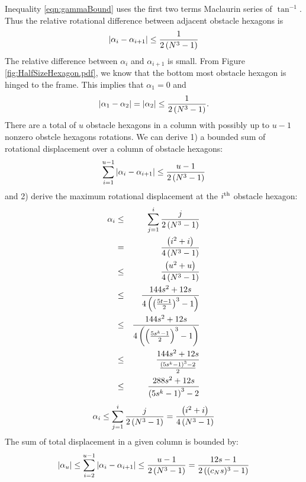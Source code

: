 Inequality \ref{eqn:gammaBound} uses the first two terms Maclaurin series of $\tan^{-1}$.
Thus the relative rotational difference between adjacent obstacle hexagons is
\begin{equation}\label{eqn:angularBound}
\left\vert \alpha_i - \alpha_{i+1} \right\vert \leq \frac{1}{2\left( N^3 - 1 \right)}
\end{equation}
The relative difference between $\alpha_i$ and $\alpha_{i+1}$ is small.
From Figure \ref{fig:HalfSizeHexagon.pdf}, we know that the bottom most obstacle hexagon is hinged to the frame.  
This implies that $\alpha_1 = 0$ and
$$\left\vert \alpha_1 - \alpha_2 \right\vert=\left\vert \alpha_2 \right\vert\leq \frac{1}{2\left( N^3 - 1 \right)}.$$
There are a total of $u$ obstacle hexagons in a column with possibly up to $u-1$ nonzero obstcle hexagons rotations.
We can derive 1) a bounded sum of rotational displacement over a column of obstacle hexagons:
\begin{equation}\label{eqn:angularSumBound}
\sum_{i=1}^{u-1} \vert \alpha_i - \alpha_{i+1} \vert \leq \frac{u-1}{2\left( N^3 - 1 \right)}
\end{equation}
and 2) derive the maximum rotational displacement at the $i^\text{th}$ obstacle hexagon:
\begin{eqnarray*}
\alpha_i &\leq& \sum_{j=1}^i\frac{j}{2\left( N^3 - 1 \right)}\\
&=&\frac{\left( i^2 + i \right)}{4\left( N^3-1 \right)}\\
&\leq& \frac{\left( u^2 + u \right)}{4\left( N^3-1 \right)}\\
&\leq& \frac{144s^2+12s}{4\left( \left( \frac{5t-1}{2} \right)^3-1 \right)}\\
&\leq& \frac{144s^2+12s}{4\left( \left( \frac{5s^k-1}{2} \right)^3-1 \right)}\\
&\leq& \frac{144s^2+12s}{\frac{\left( 5s^k-1 \right)^3-2}{2}}\\
&\leq& \frac{288s^2+12s}{\left( 5s^k-1 \right)^3-2}
\end{eqnarray*}
\begin{equation}\label{eqn:angularMaxBound}
\alpha_i \leq \sum_{j=1}^i\frac{j}{2\left( N^3 - 1 \right)}=\frac{\left( i^2 + i \right)}{4\left( N^3-1 \right)}
\end{equation}
The sum of total displacement in a given column is bounded by:
$$ \vert \alpha_u \vert \leq \sum_{i=2}^{u-1} \vert \alpha_i - \alpha_{i+1} \vert \leq \frac{u-1}{2\left( N^3 - 1 \right)}= \frac{12s - 1}{2 \left(  (c_N s)^3 - 1 \right)}$$